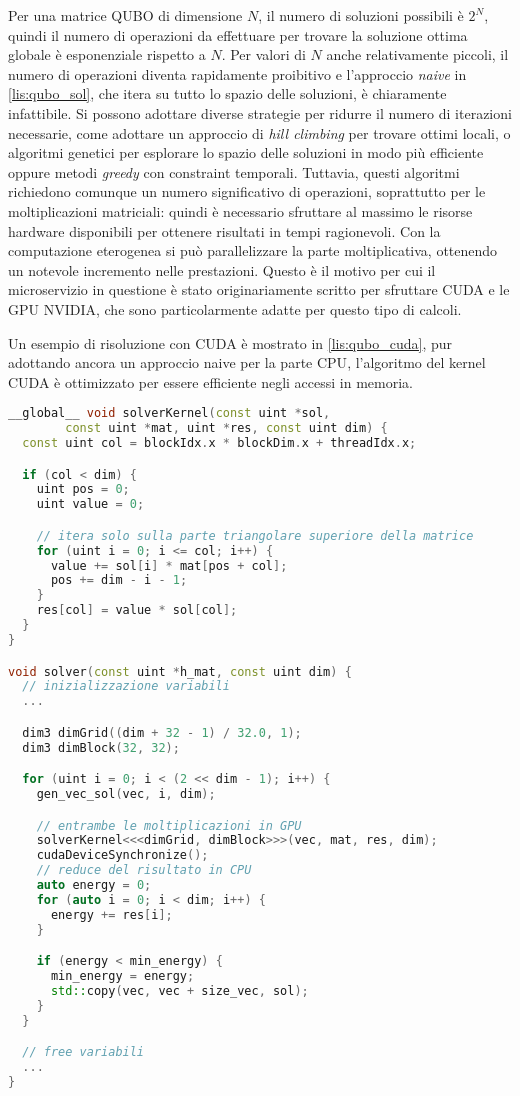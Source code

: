 Per una matrice \gls{QUBO} di dimensione $N$, il numero di soluzioni possibili è $2^N$, quindi il numero di operazioni da effettuare per trovare la soluzione ottima globale è esponenziale rispetto a $N$. Per valori di $N$ anche relativamente piccoli, il numero di operazioni diventa rapidamente proibitivo e l'approccio \textit{naive} in \ref{lis:qubo_sol}, che itera su tutto lo spazio delle soluzioni, è chiaramente infattibile.
Si possono adottare diverse strategie per ridurre il numero di iterazioni necessarie, come adottare un approccio di \textit{hill climbing} per trovare ottimi locali, o algoritmi genetici per esplorare lo spazio delle soluzioni in modo più efficiente oppure metodi \textit{greedy} con constraint temporali. Tuttavia, questi algoritmi richiedono comunque un numero significativo di operazioni, soprattutto per le moltiplicazioni matriciali: quindi è necessario sfruttare al massimo le risorse hardware disponibili per ottenere risultati in tempi ragionevoli. Con la computazione eterogenea si può parallelizzare la parte moltiplicativa, ottenendo un notevole incremento nelle prestazioni. Questo è il motivo per cui il microservizio in questione è stato originariamente scritto per sfruttare \gls{CUDA} e le \gls{GPU} NVIDIA, che sono particolarmente adatte per questo tipo di calcoli.

Un esempio di risoluzione con \gls{CUDA} è mostrato in \ref{lis:qubo_cuda}, pur adottando ancora un approccio naive per la parte \gls{CPU}, l'algoritmo del kernel \gls{CUDA} è ottimizzato per essere efficiente negli accessi in memoria.


\vspace{5mm}
\begin{lstlisting}[language=C++, caption=CUDA moltiplicazine matrice QUBO, label=lis:qubo_cuda]
__global__ void solverKernel(const uint *sol,
        const uint *mat, uint *res, const uint dim) {
  const uint col = blockIdx.x * blockDim.x + threadIdx.x;

  if (col < dim) {
    uint pos = 0;
    uint value = 0;

    // itera solo sulla parte triangolare superiore della matrice
    for (uint i = 0; i <= col; i++) {
      value += sol[i] * mat[pos + col];
      pos += dim - i - 1;
    }
    res[col] = value * sol[col];
  }
}

void solver(const uint *h_mat, const uint dim) {
  // inizializzazione variabili
  ...

  dim3 dimGrid((dim + 32 - 1) / 32.0, 1);
  dim3 dimBlock(32, 32);

  for (uint i = 0; i < (2 << dim - 1); i++) {
    gen_vec_sol(vec, i, dim);

    // entrambe le moltiplicazioni in GPU
    solverKernel<<<dimGrid, dimBlock>>>(vec, mat, res, dim);
    cudaDeviceSynchronize();
    // reduce del risultato in CPU
    auto energy = 0;
    for (auto i = 0; i < dim; i++) {
      energy += res[i];
    }

    if (energy < min_energy) {
      min_energy = energy;
      std::copy(vec, vec + size_vec, sol);
    }
  }

  // free variabili
  ...
}
\end{lstlisting}
\vspace{5mm}

